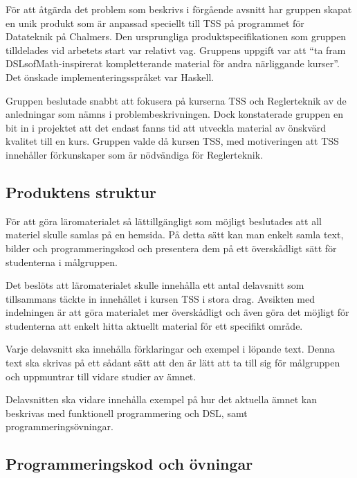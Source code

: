 \documentclass[12pt,a4paper,twoside,openright]{article}
\begin{document}

För att åtgärda det problem som beskrivs i förgående avsnitt har
gruppen skapat en unik produkt som är anpassad speciellt till TSS på
programmet för Datateknik på Chalmers. Den ursprungliga
produktspecifikationen som gruppen tilldelades vid arbetets start var
relativt vag. Gruppens uppgift var att ``ta fram DSLsofMath-inspirerat
kompletterande material för andra närliggande kurser''. Det önskade
implementeringsspråket var Haskell.

Gruppen beslutade snabbt att fokusera på kurserna TSS och Reglerteknik
av de anledningar som nämns i problembeskrivningen. Dock konstaterade
gruppen en bit in i projektet att det endast fanns tid att utveckla
material av önskvärd kvalitet till en kurs. Gruppen valde då kursen
TSS, med motiveringen att TSS innehåller förkunskaper som är
nödvändiga för Reglerteknik.

\subsection{Produktens struktur}
\label{sec:prodSpec}
För att göra läromaterialet så lättillgängligt som möjligt beslutades att
all materiel skulle samlas på en hemsida. På detta sätt kan man enkelt
samla text, bilder och programmeringskod och presentera dem på ett
överskådligt sätt för studenterna i målgruppen.

Det beslöts att läromaterialet skulle innehålla ett antal delavsnitt
som tillsammans täckte in innehållet i kursen TSS i stora drag.
Avsikten med indelningen är att göra materialet mer överskådligt och
även göra det möjligt för studenterna att enkelt hitta aktuellt
material för ett specifikt område.

Varje delavsnitt ska innehålla förklaringar och exempel i löpande text.
Denna text ska skrivas på ett sådant sätt att den är lätt att ta till
sig för målgruppen och uppmuntrar till vidare studier av ämnet.

Delavsnitten ska vidare innehålla exempel på hur det aktuella ämnet kan
beskrivas med funktionell programmering och DSL, samt programmeringsövningar.

\subsection{Programmeringskod och övningar}
\end{document}
